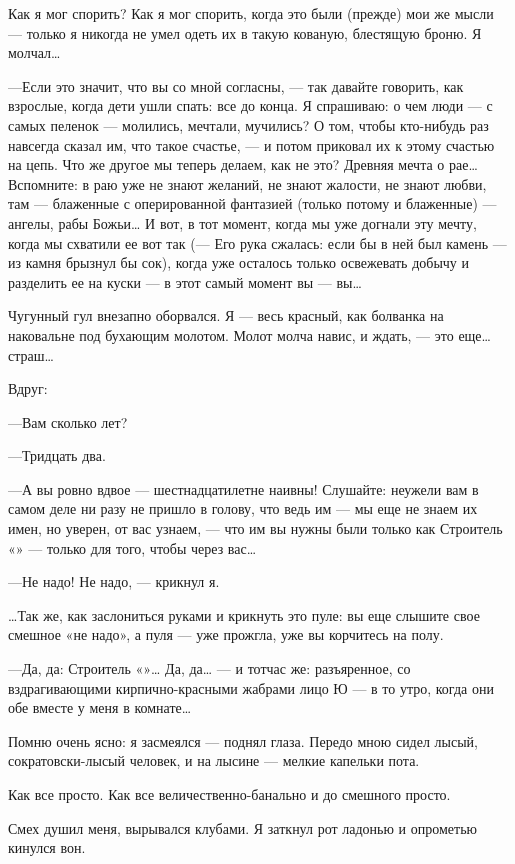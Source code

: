\documentclass[11pt,openany]{book}
\begin{document}
Как я мог спорить? Как я мог спорить, когда это были (прежде) мои же мысли --- только я никогда не умел одеть их в такую кованую, блестящую броню. Я молчал\ldots{}

---Если это значит, что вы со мной согласны, --- так давайте говорить, как взрослые, когда дети ушли спать: все до конца. Я спрашиваю: о чем люди --- с самых пеленок --- молились, мечтали, мучились? О том, чтобы кто-нибудь раз навсегда сказал им, что такое счастье, --- и потом приковал их к этому счастью на цепь. Что же другое мы теперь делаем, как не это? Древняя мечта о рае\ldots{} Вспомните: в раю уже не знают желаний, не знают жалости, не знают любви, там --- блаженные с оперированной фантазией (только потому и блаженные) --- ангелы, рабы Божьи\ldots{} И вот, в тот момент, когда мы уже догнали эту мечту, когда мы схватили ее вот так (--- Его рука сжалась: если бы в ней был камень --- из камня брызнул бы сок), когда уже осталось только освежевать добычу и разделить ее на куски --- в этот самый момент вы --- вы\ldots{}

Чугунный гул внезапно оборвался. Я --- весь красный, как болванка на наковальне под бухающим молотом. Молот молча навис, и ждать, --- это еще\ldots{} страш\ldots{}

Вдруг:

---Вам сколько лет?

---Тридцать два.

---А вы ровно вдвое --- шестнадцатилетне наивны! Слушайте: неужели вам в самом деле ни разу не пришло в голову, что ведь им --- мы еще не знаем их имен, но уверен, от вас узнаем, --- что им вы нужны были только как Строитель «» --- только для того, чтобы через вас\ldots{}

---Не надо! Не надо, --- крикнул я.

\ldots{}Так же, как заслониться руками и крикнуть это пуле: вы еще слышите свое смешное «не надо», а пуля --- уже прожгла, уже вы корчитесь на полу.

---Да, да: Строитель «»\ldots{} Да, да\ldots{} --- и тотчас же: разъяренное, со вздрагивающими кирпично-красными жабрами лицо Ю --- в то утро, когда они обе вместе у меня в комнате\ldots{}

Помню очень ясно: я засмеялся --- поднял глаза. Передо мною сидел лысый, сократовски-лысый человек, и на лысине --- мелкие капельки пота.

Как все просто. Как все величественно-банально и до смешного просто.

Смех душил меня, вырывался клубами. Я заткнул рот ладонью и опрометью кинулся вон.
\end{document}
